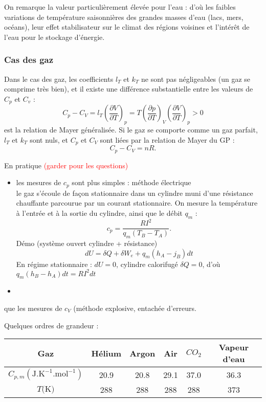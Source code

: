 \documentclass[11pt,a4paper]{report}
\begin{document}
On remarque la valeur particulièrement élevée pour l'eau : d'où les faibles variations de température saisonnières des grandes masses d'eau (lacs, mers, océans), leur effet stabilisateur sur le climat des régions voisines et l'intérêt de l'eau pour le stockage d'énergie.

\subsubsection{Cas des gaz}

Dans le cas des gaz, les coefficients $l_T$ et $k_T$ ne sont pas négligeables (un gaz se comprime très bien), et il existe une différence substantielle entre les valeurs de $C_p$ et $C_v$ :
	\begin{equation}
		C_p - C_V = l_T\left(\frac{\partial V}{\partial T}\right)_p = T\left(\frac{\partial p}{\partial T}\right)_V\left(\frac{\partial V}{\partial T}\right)_p > 0
	\end{equation}
est la relation de Mayer généralisée. Si le gaz se comporte comme un gaz parfait, $l_T$ et $k_T$ sont nuls, et $C_p$ et $C_V$ sont liées par la relation de Mayer du GP :
	\begin{equation}
		C_p - C_V = nR.
	\end{equation}

En pratique \textcolor{red}{(garder pour les questions)}
\begin{itemize}
	\item les mesures de $c_p$ sont plus simples : méthode électrique\\
	le gaz s'écoule de façon stationnaire dans un cylindre muni d'une résistance chauffante parcourue par un courant stationnaire. On mesure la température à l'entrée et à la sortie du cylindre, ainsi que le débit $q_m$ :
	\begin{equation}
		c_p = \frac{RI^2}{q_m(T_B - T_A)}.
	\end{equation}
	Démo (système ouvert cylindre + résistance)
	\begin{equation}
		dU = \delta Q + \delta W_e + q_m(h_A - j_B)dt
	\end{equation}
	En régime stationnaire : $dU = 0$, cylindre calorifugé $\delta Q = 0$, d'où $q_m(h_B-h_A)dt = RI^2dt$
	\item
\end{itemize}
que les mesures de $c_V$ (méthode explosive, entachée d'erreurs.

Quelques ordres de grandeur :\\
\begin{center}
\begin{tabular}{|c|c|c|c|c|c|}
  \hline
  Gaz & Hélium & Argon & Air & $CO_2$ & Vapeur d'eau\\
  \hline
  $C_{p,m} (\text{J}.\text{K}^{-1}.\text{mol}^{-1})$ & 20.9 & 20.8 & 29.1 & 37.0 & 36.3\\
  \hline
  $T \text{(K)}$ & 288 & 288 & 288 & 288 & 373\\
  \hline
\end{tabular}
\end{center}
\end{document}
